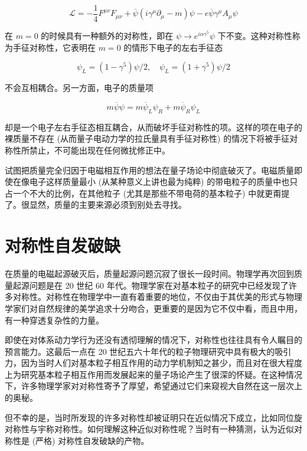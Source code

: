 \documentclass[oneside,a4paper,openany,11pt]{ctexbook}
\begin{document}
\begin{equation}
    \mathcal{L} = -\frac{1}{4} F^{\mu\nu} F_{\mu\nu} + \overline{\psi}(i\gamma^\mu\partial_\mu - m) \psi - e \overline{\psi} \gamma^\mu A_\mu \psi
\end{equation}

在 $m=0$ 的时候具有一种额外的对称性，即在 $\psi \to e^{i\alpha\gamma^5} \psi$ 下不变。这种对称性称为手征对称性，它表明在 $m=0$ 的情形下电子的左右手征态

\begin{equation}
    \psi_L = (1-\gamma^5) \psi/2, \quad \psi_L = (1+\gamma^5) \psi/2
\end{equation}

\noindent 不会互相耦合。另一方面，电子的质量项

\begin{equation}
    m \overline{\psi} \psi = m \overline{\psi}_L \psi_R + m \overline{\psi}_R \psi_L
\end{equation}

却是一个电子左右手征态相互耦合，从而破坏手征对称性的项。这样的项在电子的裸质量不存在 (从而量子电动力学的拉氏量具有手征对称性) 的情况下将被手征对称性所禁止，不可能出现在任何微扰修正中。

试图把质量完全归因于电磁相互作用的想法在量子场论中彻底破灭了。电磁质量即使在像电子这样质量最小 (从某种意义上讲也最为纯粹) 的带电粒子的质量中也只占一个不大的比例，在其他粒子 (尤其是那些不带电荷的基本粒子) 中就更甭提了。很显然，质量的主要来源必须到别处去寻找。

\section{对称性自发破缺}

在质量的电磁起源破灭后，质量起源问题沉寂了很长一段时间。物理学再次回到质量起源问题是在 20 世纪 60 年代。物理学家在对基本粒子的研究中已经发现了许多对称性。对称性在物理学中一直有着重要的地位，不仅由于其优美的形式与物理学家们对自然规律的美学追求十分吻合，更重要的是因为它不仅中看，而且中用，有一种穿透复杂性的力量。

即使在对体系动力学行为还没有透彻理解的情况下，对称性也往往具有令人瞩目的预言能力。这最后一点在 20 世纪五六十年代的粒子物理研究中具有极大的吸引力，因为当时人们对基本粒子相互作用的动力学机制知之甚少，而且对在很大程度上为研究基本粒子相互作用而发展起来的量子场论产生了很深的怀疑。在这种情况下，许多物理学家对对称性寄予了厚望，希望通过它们来窥视大自然在这一层次上的奥秘。

但不幸的是，当时所发现的许多对称性却被证明只在近似情况下成立，比如同位旋对称性与宇称对称性。如何理解这种近似对称性呢？当时有一种猜测，认为近似对称性是 (严格) 对称性自发破缺的产物。
\end{document}
